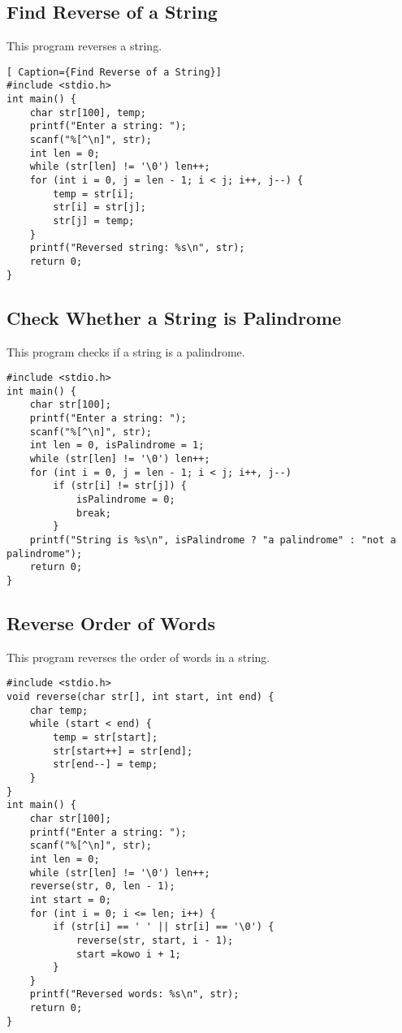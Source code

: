 \documentclass[a4paper,12pt]{article}
\begin{document}
\subsection{Find Reverse of a String}
This program reverses a string.
\begin{lstlisting}[ Caption={Find Reverse of a String}]
#include <stdio.h>
int main() {
    char str[100], temp;
    printf("Enter a string: ");
    scanf("%[^\n]", str);
    int len = 0;
    while (str[len] != '\0') len++;
    for (int i = 0, j = len - 1; i < j; i++, j--) {
        temp = str[i];
        str[i] = str[j];
        str[j] = temp;
    }
    printf("Reversed string: %s\n", str);
    return 0;
}
\end{lstlisting}
\clearpage

\subsection{Check Whether a String is Palindrome}
This program checks if a string is a palindrome.
\begin{lstlisting}[caption={Check Whether a String is Palindrome}]
#include <stdio.h>
int main() {
    char str[100];
    printf("Enter a string: ");
    scanf("%[^\n]", str);
    int len = 0, isPalindrome = 1;
    while (str[len] != '\0') len++;
    for (int i = 0, j = len - 1; i < j; i++, j--)
        if (str[i] != str[j]) {
            isPalindrome = 0;
            break;
        }
    printf("String is %s\n", isPalindrome ? "a palindrome" : "not a palindrome");
    return 0;
}
\end{lstlisting}
\clearpage

\subsection{Reverse Order of Words}
This program reverses the order of words in a string.
\begin{lstlisting}[caption={Reverse Order of Words}]
#include <stdio.h>
void reverse(char str[], int start, int end) {
    char temp;
    while (start < end) {
        temp = str[start];
        str[start++] = str[end];
        str[end--] = temp;
    }
}
int main() {
    char str[100];
    printf("Enter a string: ");
    scanf("%[^\n]", str);
    int len = 0;
    while (str[len] != '\0') len++;
    reverse(str, 0, len - 1);
    int start = 0;
    for (int i = 0; i <= len; i++) {
        if (str[i] == ' ' || str[i] == '\0') {
            reverse(str, start, i - 1);
            start =kowo i + 1;
        }
    }
    printf("Reversed words: %s\n", str);
    return 0;
}
\end{lstlisting}
\clearpage
\end{document}
